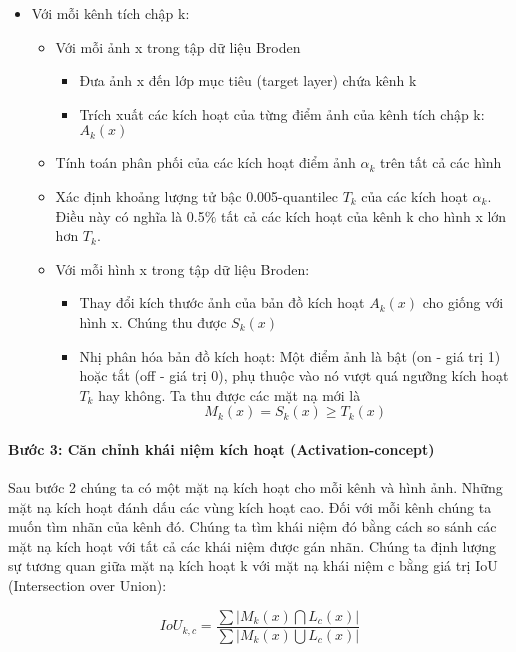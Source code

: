 \begin{itemize}
    \item Với mỗi kênh tích chập k:
    \begin{itemize}
        \item Với mỗi ảnh x trong tập dữ liệu Broden
        \begin{itemize}
            \item Đưa ảnh x đến lớp mục tiêu (target layer) chứa kênh k
            \item Trích xuất các kích hoạt của từng điểm ảnh của kênh tích chập k: $A_k(x)$
        \end{itemize}
        \item Tính toán phân phối của các kích hoạt điểm ảnh $\alpha_k$ trên tất cả các hình
        \item Xác định khoảng lượng tử bậc 0.005-quantilec $T_k$ của các kích hoạt $\alpha_k$. Điều này có nghĩa là 0.5$\%$ tất cả các kích hoạt của kênh k cho hình x lớn hơn $T_k$.
        \item Với mỗi hình x trong tập dữ liệu Broden:
        \begin{itemize}
            \item Thay đổi kích thước ảnh của bản đồ kích hoạt $A_k(x)$ cho giống với hình x. Chúng thu được $S_k(x)$
            \item Nhị phân hóa bản đồ kích hoạt: Một điểm ảnh là bật (on - giá trị 1) hoặc tắt (off - giá trị 0), phụ thuộc vào nó vượt quá ngưỡng kích hoạt $T_k$ hay không. Ta thu được các mặt nạ mới là \[M_k(x)=S_k(x)\geq{}T_k(x)\]
        \end{itemize}
    \end{itemize}
\end{itemize}


\paragraph{Bước 3: Căn chỉnh khái niệm kích hoạt (Activation-concept)}

Sau bước 2 chúng ta có một mặt nạ kích hoạt cho mỗi kênh và hình ảnh. Những mặt nạ kích hoạt đánh dấu các vùng kích hoạt cao. Đối với mỗi kênh chúng ta muốn tìm nhãn của kênh đó. Chúng ta tìm khái niệm đó bằng cách so sánh các mặt nạ kích hoạt với tất cả các khái niệm được  gán nhãn. Chúng ta định lượng sự tương quan giữa mặt nạ kích hoạt k với mặt nạ khái niệm c bằng giá trị IoU (Intersection over Union):

\[IoU_{k,c}=\frac{\sum|M_k(x)\bigcap{}L_c(x)|}{\sum|M_k(x)\bigcup{}L_c(x)|}\]

